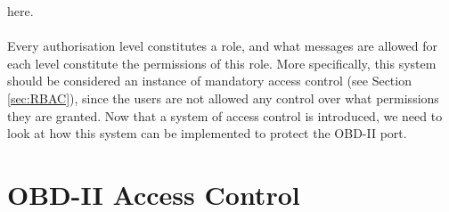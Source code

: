 here. \\ \\ Every authorisation level constitutes a role, and what messages are allowed for each level constitute the permissions of this role. More specifically, this system should be considered an instance of mandatory access control (see Section \ref{sec:RBAC}), since the users are not allowed any control over what permissions they are granted. Now that a system of access control is introduced, we need to look at how this system can be implemented to protect the OBD-II port.

\section{OBD-II Access Control}
\label{sec:obd2_access_control}

